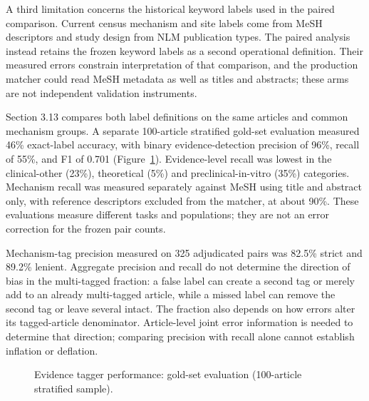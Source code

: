 \documentclass[11pt,twoside,openright]{report}
\begin{document}
A third limitation concerns the historical keyword labels used in the paired comparison. Current census mechanism and site labels come from MeSH descriptors and study design from NLM publication types. The paired analysis instead retains the frozen keyword labels as a second operational definition. Their measured errors constrain interpretation of that comparison, and the production matcher could read MeSH metadata as well as titles and abstracts; these arms are not independent validation instruments.

Section 3.13 compares both label definitions on the same articles and common mechanism groups. A separate 100-article stratified gold-set evaluation measured 46\% exact-label accuracy, with binary evidence-detection precision of 96\%, recall of 55\%, and F1 of 0.701 (Figure~\ref{fig:fig13_gold_set_eval}). Evidence-level recall was lowest in the clinical-other (23\%), theoretical (5\%) and preclinical-in-vitro (35\%) categories. Mechanism recall was measured separately against MeSH using title and abstract only, with reference descriptors excluded from the matcher, at about 90\%. These evaluations measure different tasks and populations; they are not an error correction for the frozen pair counts.

Mechanism-tag precision measured on 325 adjudicated pairs was 82.5\% strict and 89.2\% lenient. Aggregate precision and recall do not determine the direction of bias in the multi-tagged fraction: a false label can create a second tag or merely add to an already multi-tagged article, while a missed label can remove the second tag or leave several intact. The fraction also depends on how errors alter its tagged-article denominator. Article-level joint error information is needed to determine that direction; comparing precision with recall alone cannot establish inflation or deflation.

\begin{figure}[tbp]
\setcounter{figure}{8}
\caption{Evidence tagger performance: gold-set evaluation (100-article stratified sample).}
\label{fig:fig13_gold_set_eval}
\end{figure}
\end{document}
